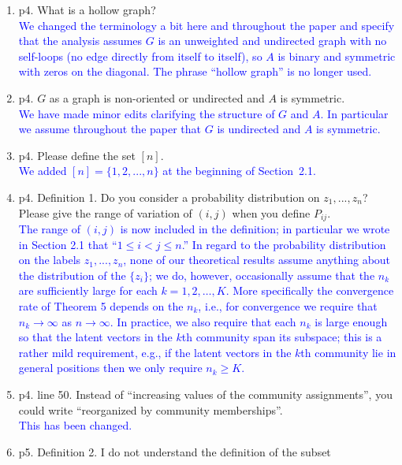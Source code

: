 \documentclass[
]{article}
\begin{document}
\begin{enumerate}
\def\labelenumi{\arabic{enumi}.}
\item
  p4. What is a hollow graph?\\
  \textcolor{blue}{
  We changed the terminology a bit here and throughout the paper and
  specify that the analysis assumes $G$ is an unweighted and undirected
  graph with no self-loops 
  (no edge directly from itself to itself), 
  so $A$ is binary and symmetric with zeros on the diagonal. The phrase
  ``hollow graph'' is no longer used.  }
\item
  p4. \(G\) as a graph is non-oriented or undirected and \(A\) is
  symmetric.\\
  \textcolor{blue}{
  We have made minor edits clarifying the structure of $G$ and $A$. In
  particular we assume throughout the paper that $G$ is undirected and $A$ is
  symmetric. 
  }
\item
  p4. Please define the set \([n]\).\\
  \textcolor{blue}{
  We added $[n] = \{1, 2, ..., n\}$ at the beginning of Section~2.1. 
  }
\item
  p4. Definition 1. Do you consider a probability distribution on
  \(z_1, ..., z_n\)? Please give the range of variation of \((i, j)\)
  when you define \(P_{ij}\).\\
  \textcolor{blue}{
  The range of $(i, j)$ is now included in the definition; in particular
  we wrote in Section 2.1 that ``$1 \leq i < j \leq n$.''
  In regard to the probability distribution on the labels $z_1, ...,
  z_n$, none of our theoretical results assume anything about the distribution
  of the $\{z_i\}$; we do, however, occasionally assume that the $n_k$
  are sufficiently large for each $k = 1,2,\dots, K$. More specifically 
  the convergence rate of Theorem 5 depends on the $n_k$, i.e., for
  convergence we require that $n_k \to \infty$ as $n \rightarrow
  \infty$. In practice, we also require that each $n_k$ is large enough
  so that the latent vectors in the $k$th community span its
  subspace; this is a rather mild requirement, e.g., if the latent vectors in the $k$th community lie in 
  general positions then we only require $n_k
  \geq K$.}
\item
  p4. line 50. Instead of ``increasing values of the community
  assignments'', you could write ``reorganized by community
  memberships''.\\
  \textcolor{blue}{
  This has been changed.
  }
\item
  p5. Definition 2. I do not understand the definition of the subset

\end{enumerate}
\end{document}
